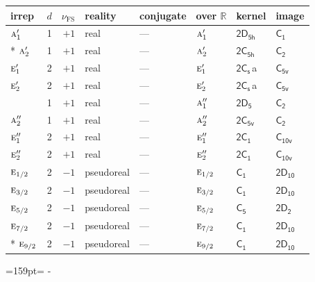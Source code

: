 \documentclass[10pt,a4paper]{article}
\makeatletter
\def\grouprule#1#2{\noalign{\marks\LTgroupmarks{\the\belowrulesep}\nobreak\vskip#1%
  \vskip\aboverulesep}\multispan\LT@cols\unskip{\leaders\hrule\@height#2\hfill\kern\z@}\cr
  \noalign{\penalty\LTrulebreak\vskip\belowrulesep\global\@lastruleclass\z@}}
\newcommand{\needspace}[1]{\par\penalty-100\begingroup\dimen0=#1\relax\dimen2=\pagegoal
  \advance\dimen2-\pagetotal\ifdim\dimen0>\dimen2\relax\ifdim\dimen2>0pt\vfil\break\fi\fi
  \endgroup}
\numberwithin{equation}{section}
\newcommand{\grp}[1]{\mathsf{#1}}
\newcommand{\irr}[1]{\text{\normalfont\scshape #1}}
\newcommand{\detbox}[1]{{\setlength{\fboxsep}{1pt}\fbox{#1}}}
\newcommand{\clsletter}[1]{\,{\scriptsize\color{black!55}#1}}
\newcommand{\fsind}{\nu_{\mathrm{FS}}}
\makeatother
\begin{document}
\setlength{\emergencystretch}{2em}\par\setlength{\emergencystretch}{0pt}
{\small\renewcommand{\arraystretch}{1.25}\setlength{\tabcolsep}{4pt}\begin{longtable}{@{}lrrlllll@{}}\toprule
irrep & $d$ & $\fsind$ & reality & conjugate & over $\mathbb{R}$ & kernel & image\\\midrule\endhead
\bottomrule\endfoot\endlastfoot
$\irr{a}_{1}'$ & 1 & $+1$ & real & --- & $\irr{a}_{1}'$ & \href{2D5h.pdf}{$\grp{2D_{5h}}$} & \href{../../../rotation/data/pdf/C1.pdf}{$\grp{C_{1}}$}\\*
$\irr{a}_{2}'$ & 1 & $+1$ & real & --- & $\irr{a}_{2}'$ & \href{2C5h.pdf}{$\grp{2C_{5h}}$} & \href{../../../rotation/data/pdf/C2.pdf}{$\grp{C_{2}}$}\\
$\irr{e}_{1}'$ & 2 & $+1$ & real & --- & $\irr{e}_{1}'$ & \href{2C1v.pdf}{$\grp{2C_{s}}$}\clsletter{a} & \href{../../../rotation/data/pdf/C5v.pdf}{$\grp{C_{5v}}$}\\
$\irr{e}_{2}'$ & 2 & $+1$ & real & --- & $\irr{e}_{2}'$ & \href{2C1v.pdf}{$\grp{2C_{s}}$}\clsletter{a} & \href{../../../rotation/data/pdf/C5v.pdf}{$\grp{C_{5v}}$}\\
\detbox{$\irr{a}_{1}''$} & 1 & $+1$ & real & --- & $\irr{a}_{1}''$ & \href{2D5.pdf}{$\grp{2D_{5}}$} & \href{../../../rotation/data/pdf/C2.pdf}{$\grp{C_{2}}$}\\
$\irr{a}_{2}''$ & 1 & $+1$ & real & --- & $\irr{a}_{2}''$ & \href{2C5v.pdf}{$\grp{2C_{5v}}$} & \href{../../../rotation/data/pdf/C2.pdf}{$\grp{C_{2}}$}\\
$\irr{e}_{1}''$ & 2 & $+1$ & real & --- & $\irr{e}_{1}''$ & \href{2C1.pdf}{$\grp{2C_{1}}$} & \href{../../../rotation/data/pdf/C10v.pdf}{$\grp{C_{10v}}$}\\
$\irr{e}_{2}''$ & 2 & $+1$ & real & --- & $\irr{e}_{2}''$ & \href{2C1.pdf}{$\grp{2C_{1}}$} & \href{../../../rotation/data/pdf/C10v.pdf}{$\grp{C_{10v}}$}\\
\grouprule{0pt}{\lightrulewidth}
$\irr{e}_{1/2}$ & 2 & $-1$ & pseudoreal & --- & $\irr{e}_{1/2}$ & \href{C1.pdf}{$\grp{C_{1}}$} & \href{2D10.pdf}{$\grp{2D_{10}}$}\\
$\irr{e}_{3/2}$ & 2 & $-1$ & pseudoreal & --- & $\irr{e}_{3/2}$ & \href{C1.pdf}{$\grp{C_{1}}$} & \href{2D10.pdf}{$\grp{2D_{10}}$}\\
$\irr{e}_{5/2}$ & 2 & $-1$ & pseudoreal & --- & $\irr{e}_{5/2}$ & \href{C5.pdf}{$\grp{C_{5}}$} & \href{2D2.pdf}{$\grp{2D_{2}}$}\\
$\irr{e}_{7/2}$ & 2 & $-1$ & pseudoreal & --- & $\irr{e}_{7/2}$ & \href{C1.pdf}{$\grp{C_{1}}$} & \href{2D10.pdf}{$\grp{2D_{10}}$}\\*
$\irr{e}_{9/2}$ & 2 & $-1$ & pseudoreal & --- & $\irr{e}_{9/2}$ & \href{C1.pdf}{$\grp{C_{1}}$} & \href{2D10.pdf}{$\grp{2D_{10}}$}\\
\bottomrule\end{longtable}}
\needspace{159pt}
\end{document}
